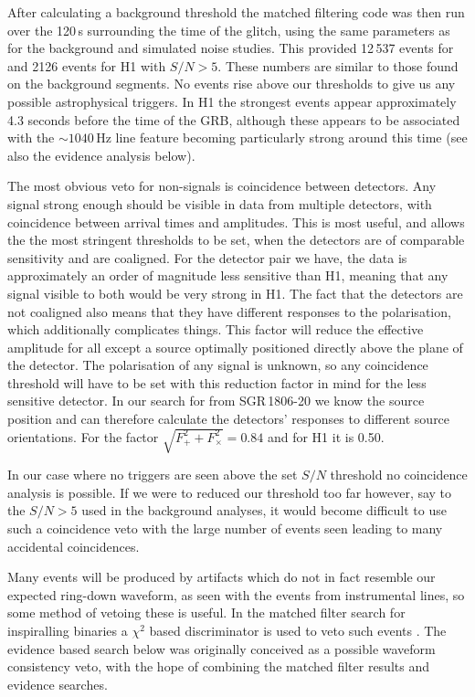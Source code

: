 After calculating a background threshold the matched filtering code was then run over the 120\,s
surrounding the time of the glitch, using the same parameters as for the background and simulated
noise studies. This provided 12\,537 events for \geo and 2126 events for H1 with $S/N > 5$. These
numbers are similar to those found on the background segments. No events rise above our thresholds
to give us any possible astrophysical triggers. In H1 the strongest events appear approximately 4.3
seconds before the time of the GRB, although these appears to be associated with the $\sim 1040$\,Hz
line feature becoming particularly strong around this time (see also the evidence analysis below). 

The most obvious veto for non-\gw signals is coincidence between detectors. Any \gw signal strong
enough should be visible in data from multiple detectors, with coincidence between arrival times
and amplitudes. This is most useful, and allows the the most stringent thresholds to be set, when
the detectors are of comparable sensitivity and are coaligned. For the detector pair we have, the
\geo data is approximately an order of magnitude less sensitive than H1, meaning that any signal
visible to both would be very strong in H1. The fact that the detectors are not coaligned also means
that they have different responses to the \gw polarisation, which additionally complicates things.
This factor will reduce the effective \gw amplitude for all except a source optimally positioned
directly above the plane of the detector. The polarisation of any signal is unknown, so any
coincidence threshold will have to be set with this reduction factor in mind for the less sensitive
detector. In our search for \gws from SGR\,1806-20 we know the source position and can therefore
calculate the detectors' responses to different source orientations. For \geo the factor
$\sqrt{F_+^2 + F_\times^2} = 0.84$ and for H1 it is 0.50. 

In our case where no triggers are seen above the set $S/N$ threshold no coincidence analysis is
possible. If we were to reduced our threshold too far however, say to the $S/N > 5$ used in the
background analyses, it would become difficult to use such a coincidence veto with the large number
of events seen leading to many accidental coincidences.

Many events will be produced by artifacts which do not in fact resemble our expected ring-down
waveform, as seen with the events from instrumental lines, so some method of vetoing these is
useful. In the matched filter search for inspiralling binaries a $\chi^2$ based discriminator is
used to veto such events \cite{Allen:2005}. The evidence based search below was originally conceived
as a possible waveform consistency veto, with the hope of combining the matched filter results and
evidence searches.

